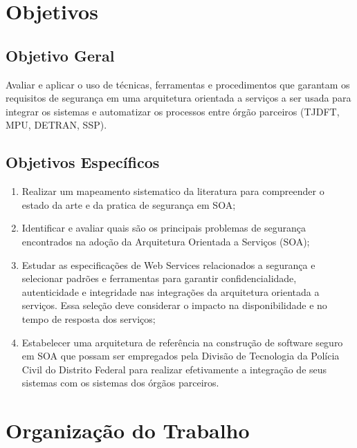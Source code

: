 \section{Objetivos}\label{sec:Obj}
\subsection{Objetivo Geral}

Avaliar e aplicar o uso de técnicas, ferramentas  e procedimentos que garantam os requisitos de segurança em uma arquitetura orientada a serviços a ser usada para integrar os sistemas e automatizar os processos entre órgão parceiros (TJDFT, MPU, DETRAN, SSP).

\subsection{Objetivos Espec\'ificos}

\begin{enumerate}[a )]
	\item Realizar um mapeamento sistematico da literatura para compreender o estado da arte e da pratica de segurança em SOA;

	\item Identificar e avaliar quais são os principais problemas de segurança encontrados na adoção da Arquitetura Orientada a Serviços (SOA);

	\item Estudar as especificações de Web Services relacionados a segurança e selecionar padrões e ferramentas para garantir confidencialidade, autenticidade e integridade nas integrações da arquitetura orientada a serviços. Essa seleção deve considerar o impacto na disponibilidade e no tempo de resposta dos serviços;

    \item Estabelecer uma arquitetura de referência na construção de software seguro em  SOA que possam ser empregados pela Divisão de Tecnologia da Polícia Civil do Distrito Federal para realizar efetivamente a integração de seus sistemas com os sistemas dos órgãos parceiros.

\end{enumerate}

\section{Organização do Trabalho}

